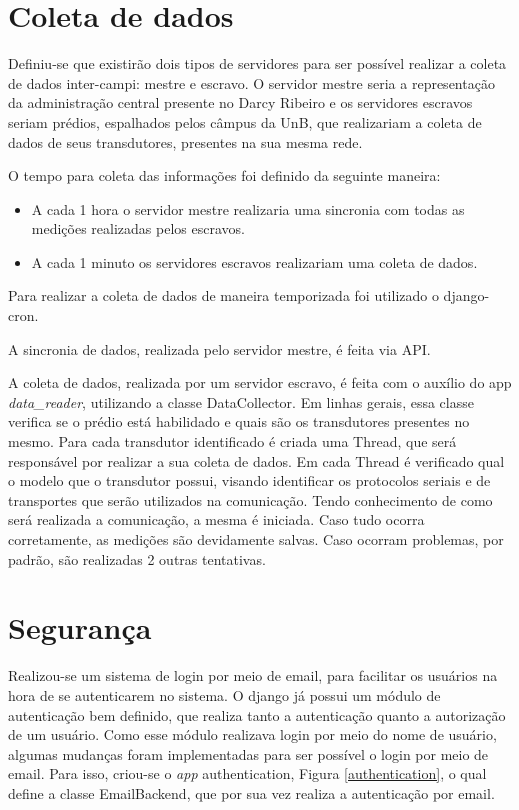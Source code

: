 \section{Coleta de dados}
Definiu-se que existirão dois tipos de servidores para ser possível realizar a coleta de dados inter-campi: mestre e escravo. O servidor mestre seria a representação da administração central presente no Darcy Ribeiro e os servidores escravos seriam prédios, espalhados pelos câmpus da UnB, que realizariam a coleta de dados de seus transdutores, presentes na sua mesma rede.

O tempo para coleta das informações foi definido da seguinte maneira:

\begin{itemize}
    \item A cada 1 hora o servidor mestre realizaria uma sincronia com todas as medições realizadas pelos escravos.
    \item A cada 1 minuto os servidores escravos realizariam uma coleta de dados.
\end{itemize}

Para realizar a coleta de dados de maneira temporizada foi utilizado o django-cron.

A sincronia de dados, realizada pelo servidor mestre, é feita via API.

A coleta de dados, realizada por um servidor escravo, é feita com o auxílio do app \textit{data\_reader}, utilizando a classe DataCollector. Em linhas gerais, essa classe verifica se o prédio está habilidado e quais são os transdutores presentes no mesmo. Para cada transdutor identificado é criada uma Thread, que será responsável por realizar a sua coleta de dados. Em cada Thread é verificado qual o modelo que o transdutor possui, visando identificar os protocolos seriais e de transportes que serão utilizados na comunicação. Tendo conhecimento de como será realizada a comunicação, a mesma é iniciada. Caso tudo ocorra corretamente, as medições são devidamente salvas. Caso ocorram problemas, por padrão, são realizadas 2 outras tentativas.

\section{Segurança}
Realizou-se um sistema de login por meio de email, para facilitar os usuários na hora de se autenticarem no sistema. O django já possui um módulo de autenticação bem definido, que realiza tanto a autenticação quanto a autorização de um usuário. Como esse módulo realizava login por meio do nome de usuário, algumas mudanças foram implementadas para ser possível o login por meio de email. Para isso, criou-se o \textit{app} authentication, Figura \ref{authentication}, o qual define a classe EmailBackend, que por sua vez realiza a autenticação por email.

